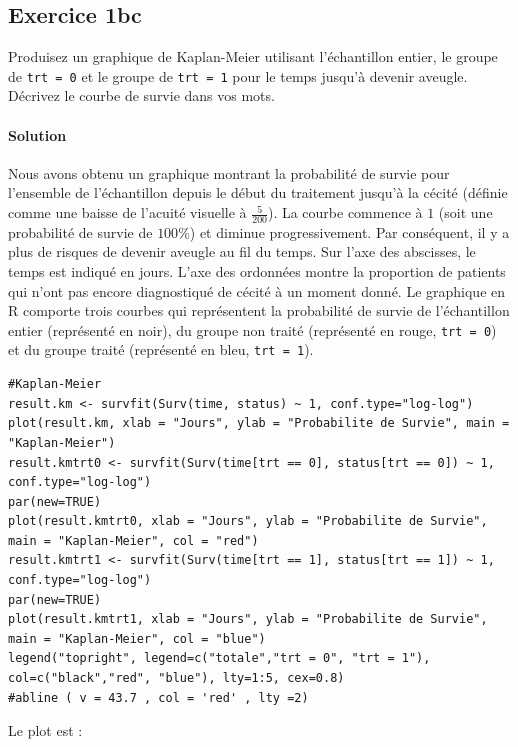 \documentclass[../main.tex]{subfiles}
\begin{document}
\begin{CJK*}{UTF8}{gbsn}

\section*{Exercice 1bc}
Produisez un graphique de Kaplan-Meier utilisant l'échantillon entier,
le groupe de \texttt{trt = 0} et le groupe de \texttt{trt = 1} 
pour le temps jusqu'à devenir aveugle.
Décrivez le courbe de survie dans vos mots.

\paragraph{Solution}

Nous avons obtenu un graphique montrant la probabilité de survie pour 
l'ensemble de l'échantillon depuis le début du traitement jusqu'à la cécité 
(définie comme une baisse de l'acuité visuelle à $\frac{5}{200}$). 
La courbe commence à $1$ (soit une probabilité de survie de $100 \%$) et diminue progressivement.
Par conséquent, il y a plus de risques de devenir aveugle au fil du temps.
Sur l'axe des abscisses, le temps est indiqué en jours.
L'axe des ordonnées montre la proportion de patients 
qui n'ont pas encore diagnostiqué de cécité à un moment donné.
Le graphique en R comporte trois courbes qui représentent 
la probabilité de survie de l'échantillon entier (représenté en noir), 
du groupe non traité (représenté en rouge, \texttt{trt = 0}) 
et du groupe traité (représenté en bleu, \texttt{trt = 1}). 

\begin{lstlisting}
#Kaplan-Meier 
result.km <- survfit(Surv(time, status) ~ 1, conf.type="log-log")
plot(result.km, xlab = "Jours", ylab = "Probabilite de Survie", main = "Kaplan-Meier")
result.kmtrt0 <- survfit(Surv(time[trt == 0], status[trt == 0]) ~ 1, conf.type="log-log")
par(new=TRUE)
plot(result.kmtrt0, xlab = "Jours", ylab = "Probabilite de Survie", main = "Kaplan-Meier", col = "red")
result.kmtrt1 <- survfit(Surv(time[trt == 1], status[trt == 1]) ~ 1, conf.type="log-log")
par(new=TRUE)
plot(result.kmtrt1, xlab = "Jours", ylab = "Probabilite de Survie", main = "Kaplan-Meier", col = "blue")
legend("topright", legend=c("totale","trt = 0", "trt = 1"), col=c("black","red", "blue"), lty=1:5, cex=0.8)
#abline ( v = 43.7 , col = 'red' , lty =2)
\end{lstlisting}

Le plot est :


\end{CJK*}
\end{document}
